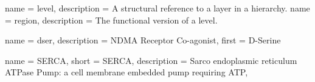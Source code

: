 %
%
%

{
	name        = {level},
	description = {A structural reference to a layer in a hierarchy.}
}
{
	name        = {region},
	description = {The functional version of a \gls{level}.}
}

{
	name        = {dser},
	description = {NDMA Receptor Co-agonist},
	first       = {D-Serine}
}

{
	name        = {SERCA},
	short       = {SERCA},
	description = {Sarco endoplasmic reticulum ATPase Pump: a cell membrane embedded pump requiring ATP},
}
